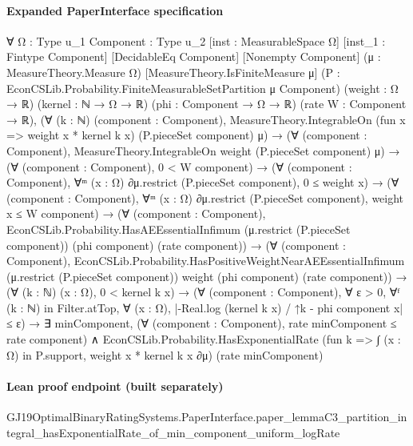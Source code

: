 \documentclass[10pt]{article}
\begin{document}
\paragraph{Expanded PaperInterface specification}
\begin{ReviewVerbatim}
∀ {Ω : Type u_1} {Component : Type u_2} [inst : MeasurableSpace Ω] [inst_1 : Fintype Component] [DecidableEq Component]
  [Nonempty Component] (μ : MeasureTheory.Measure Ω) [MeasureTheory.IsFiniteMeasure μ]
  (P : EconCSLib.Probability.FiniteMeasurableSetPartition μ Component) (weight : Ω → ℝ) (kernel : ℕ → Ω → ℝ)
  (phi : Component → Ω → ℝ) (rate W : Component → ℝ),
  (∀ (k : ℕ) (component : Component),
      MeasureTheory.IntegrableOn (fun x => weight x * kernel k x) (P.pieceSet component) μ) →
    (∀ (component : Component), MeasureTheory.IntegrableOn weight (P.pieceSet component) μ) →
      (∀ (component : Component), 0 < W component) →
        (∀ (component : Component), ∀ᵐ (x : Ω) ∂μ.restrict (P.pieceSet component), 0 ≤ weight x) →
          (∀ (component : Component), ∀ᵐ (x : Ω) ∂μ.restrict (P.pieceSet component), weight x ≤ W component) →
            (∀ (component : Component),
                EconCSLib.Probability.HasAEEssentialInfimum (μ.restrict (P.pieceSet component)) (phi component)
                  (rate component)) →
              (∀ (component : Component),
                  EconCSLib.Probability.HasPositiveWeightNearAEEssentialInfimum (μ.restrict (P.pieceSet component))
                    weight (phi component) (rate component)) →
                (∀ (k : ℕ) (x : Ω), 0 < kernel k x) →
                  (∀ (component : Component),
                      ∀ ε > 0,
                        ∀ᶠ (k : ℕ) in Filter.atTop, ∀ (x : Ω), |-Real.log (kernel k x) / ↑k - phi component x| ≤ ε) →
                    ∃ minComponent,
                      (∀ (component : Component), rate minComponent ≤ rate component) ∧
                        EconCSLib.Probability.HasExponentialRate
                          (fun k => ∫ (x : Ω) in P.support, weight x * kernel k x ∂μ) (rate minComponent)
\end{ReviewVerbatim}

\paragraph{Lean proof endpoint (built separately)}\begin{ReviewVerbatim}
GJ19OptimalBinaryRatingSystems.PaperInterface.paper_lemmaC3_partition_integral_hasExponentialRate_of_min_component_uniform_logRate
\end{ReviewVerbatim}
\end{document}
